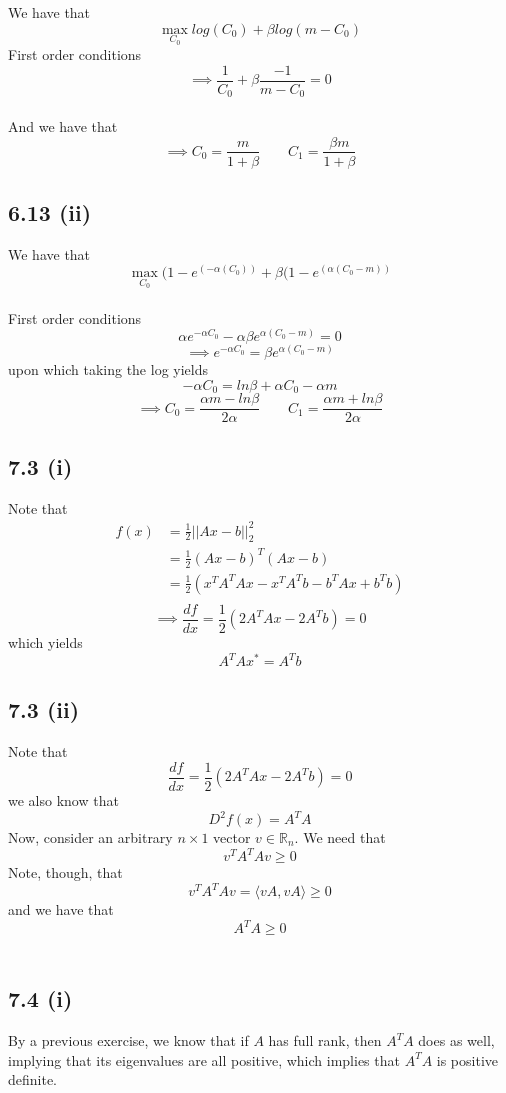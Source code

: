 \documentclass[letterpaper,12pt]{article}
\theoremstyle{definition}
\begin{document}
We have that \[\displaystyle \max_{C_0} log(C_0) + \beta log(m-C_0)\]
First order conditions
\[\implies \frac{1}{C_0} + \beta\frac{-1}{m-C_0} = 0\]\\
And we have that
\[\implies  C_0 = \frac{m}{1+\beta} \qquad C_1 = \frac{\beta m}{1+\beta}\]

\subsection*{6.13 (ii)}



We have that \[\displaystyle \max_{C_0} (1-e^(-\alpha(C_0)) + \beta (1 - e^(\alpha(C_0-m))\]\\
First order conditions
\[ \alpha e^{-\alpha C_0}- \alpha \beta e^{\alpha(C_0 - m)} =0\]
\[ \implies e^{-\alpha C_0} = \beta e^{\alpha(C_0-m)} \] upon which taking the log yields \[-\alpha C_0 = ln\beta + \alpha C_0 -\alpha m \]
\[\implies C_0 = \frac{\alpha m -ln\beta}{2 \alpha} \qquad C_1 = \frac{\alpha m + ln \beta}{2 \alpha} \]

\subsection*{7.3 (i)}

Note that
\begin{align*}
f(x)&=\frac{1}{2}||Ax-b||_2^2\\
&=\frac{1}{2}(Ax-b)^T(Ax-b)\\
&=\frac{1}{2}(x^TA^TAx-x^TA^Tb-b^TAx+b^Tb)\\
\end{align*}
\[\implies \frac{df}{dx}=\frac{1}{2}(2A^TAx-2A^Tb)=0\]
which yields
\[A^TAx^*=A^Tb\]

\subsection*{7.3 (ii)}

Note that 
\[\frac{df}{dx}=\frac{1}{2}(2A^TAx-2A^Tb)=0\] 
we also know that 
\[D^2f(x)=A^TA\]  
Now, consider an arbitrary $n\times 1$ vector $v\in \mathbb{R}_n$. We need that \[v^TA^TAv \geq 0\]Note, though, that 
\[v^TA^TAv = \langle vA, vA \rangle \geq 0\]
and we have that \[A^TA \geq 0\]\\

\subsection*{7.4 (i)}
By a previous exercise, we know that if $A$ has full rank, then $A^TA$ does as well, implying that its eigenvalues are all positive, which implies that $A^TA$ is positive definite.
\end{document}
